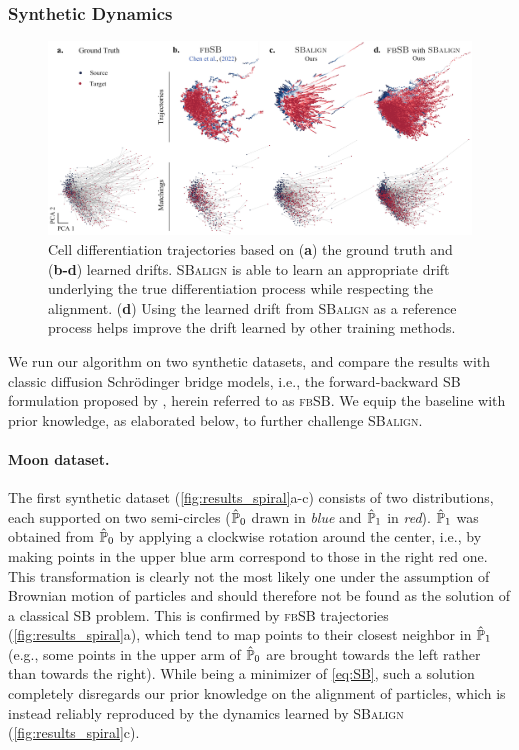 \subsubsection{Synthetic Dynamics}
\label{sec:sbalign_synthetic}

\begin{figure}
    \centering
    \includegraphics[width=\textwidth]{figures/fig_cell_trajectories_matchings.jpg}
    \caption{Cell differentiation trajectories based on (\textbf{a}) the ground truth and (\textbf{b-d}) learned drifts. \textsc{SBalign} is able to learn an appropriate drift underlying the true differentiation process while respecting the alignment. (\textbf{d}) Using the learned drift from \textsc{SBalign} as a reference process helps improve the drift learned by other training methods.}
    \label{fig:results_cell_traj}
\end{figure}

We run our algorithm on two synthetic datasets, and compare the results with classic diffusion Schr\"odinger bridge models, i.e., the forward-backward SB formulation proposed by \cite{chen2021likelihood}, herein referred to as \textsc{fbSB}. We equip the baseline with prior knowledge, as elaborated below, to further challenge \textsc{SBalign}.

\paragraph{Moon dataset.}
The first synthetic dataset (\cref{fig:results_spiral}a-c) consists of two distributions, each supported on two semi-circles ($\hat{\mathbb{P}}_{ {0} }$ drawn in \textit{blue} and $\hat{\mathbb{P}}_{ {1}}$ in \textit{red}).
$\hat{\mathbb{P}}_{ {1}}$ was obtained from $\hat{\mathbb{P}}_{ {0} }$ by applying a clockwise rotation around the center, i.e., by making points in the upper blue arm correspond to those in the right red one.
This transformation is clearly not the most likely one under the assumption of Brownian motion of particles and should therefore not be found as the solution of a classical SB problem. 
This is confirmed by \textsc{fbSB} trajectories (\cref{fig:results_spiral}a), which tend to map points to their closest neighbor in $\hat{\mathbb{P}}_{ {1}}$ (e.g., some points in the upper arm of $\hat{\mathbb{P}}_{ {0} }$ are brought towards the left rather than towards the right). 
While being a minimizer of \eqref{eq:SB}, such a solution completely disregards our prior knowledge on the alignment of particles, which is instead reliably reproduced by the dynamics learned by \textsc{SBalign} (\cref{fig:results_spiral}c).


